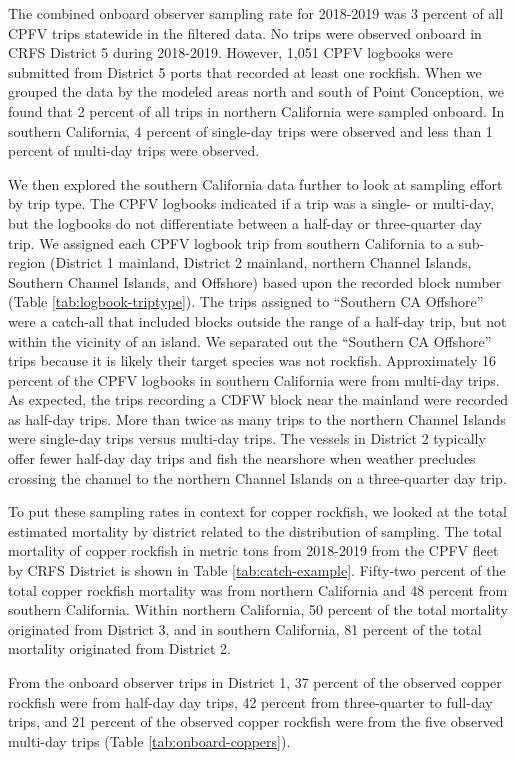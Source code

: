 \documentclass[11pt,
  english,
  letterpaper,
]{article}
\begin{document}
The combined onboard observer sampling rate for 2018-2019 was 3 percent of all CPFV trips statewide in the filtered data. No trips were observed onboard in CRFS District 5 during 2018-2019. However, 1,051 CPFV logbooks were submitted from District 5 ports that recorded at least one rockfish. When we grouped the data by the modeled areas north and south of Point Conception, we found that 2 percent of all trips in northern California were sampled onboard. In southern California, 4 percent of single-day trips were observed and less than 1 percent of multi-day trips were observed.

We then explored the southern California data further to look at sampling effort by trip type. The CPFV logbooks indicated if a trip was a single- or multi-day, but the logbooks do not differentiate between a half-day or three-quarter day trip. We assigned each CPFV logbook trip from southern California to a sub-region (District 1 mainland, District 2 mainland, northern Channel Islands, Southern Channel Islands, and Offshore) based upon the recorded block number (Table \ref{tab:logbook-triptype}). The trips assigned to ``Southern CA Offshore'' were a catch-all that included blocks outside the range of a half-day trip, but not within the vicinity of an island. We separated out the ``Southern CA Offshore'' trips because it is likely their target species was not rockfish. Approximately 16 percent of the CPFV logbooks in southern California were from multi-day trips. As expected, the trips recording a CDFW block near the mainland were recorded as half-day trips. More than twice as many trips to the northern Channel Islands were single-day trips versus multi-day trips. The vessels in District 2 typically offer fewer half-day day trips and fish the nearshore when weather precludes crossing the channel to the northern Channel Islands on a three-quarter day trip.

To put these sampling rates in context for copper rockfish, we looked at the total estimated mortality by district related to the distribution of sampling. The total mortality of copper rockfish in metric tons from 2018-2019 from the CPFV fleet by CRFS District is shown in Table \ref{tab:catch-example}. Fifty-two percent of the total copper rockfish mortality was from northern California and 48 percent from southern California. Within northern California, 50 percent of the total mortality originated from District 3, and in southern California, 81 percent of the total mortality originated from District 2.

From the onboard observer trips in District 1, 37 percent of the observed copper rockfish were from half-day day trips, 42 percent from three-quarter to full-day trips, and 21 percent of the observed copper rockfish were from the five observed multi-day trips (Table \ref{tab:onboard-coppers}).
\end{document}
